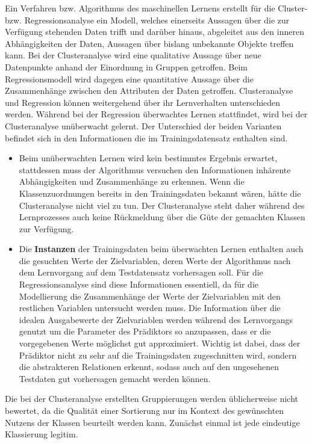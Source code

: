 \documentclass[
	12pt,
	a4paper,
	BCOR10mm,
	DIV14,
	listof=totoc,
	bibliography=totoc,
	headsepline
]{scrreprt}
\begin{document}
Ein Verfahren bzw. Algorithmus des maschinellen Lernens erstellt für die Cluster- bzw. Regressionsanalyse ein Modell, welches einerseits Aussagen über die zur Verfügung stehenden Daten trifft und darüber hinaus, abgeleitet aus den inneren Abhängigkeiten der Daten, Aussagen über bislang unbekannte Objekte treffen kann.
Bei der Clusteranalyse wird eine qualitative Aussage über neue Datenpunkte anhand der Einordnung in Gruppen getroffen.
Beim Regressionsmodell wird dagegen eine quantitative Aussage über die Zusammenhänge zwischen den Attributen der Daten getroffen. 
Clusteranalyse und Regression können weitergehend über ihr Lernverhalten unterschieden werden.
Während bei der Regression überwachtes Lernen stattfindet, wird bei der Clusteranalyse unüberwacht gelernt. Der Unterschied der beiden Varianten befindet sich in den Informationen die im Trainingsdatensatz enthalten sind.
\begin{itemize}
\item Beim unüberwachten Lernen wird kein bestimmtes Ergebnis erwartet, stattdessen muss der Algorithmus versuchen den Informationen inhärente Abhängigkeiten und Zusammenhänge zu erkennen.
Wenn die Klassenzuordnungen bereits in den Trainingsdaten bekannt wären, hätte die Clusteranalyse nicht viel zu tun. 
Der Clusteranalyse steht daher während des Lernprozesses auch keine Rückmeldung über die Güte der gemachten Klassen zur Verfügung.
\item Die \textbf{Instanzen} der Trainingsdaten beim überwachten Lernen enthalten auch die gesuchten Werte der Zielvariablen, deren Werte der Algorithmus nach dem Lernvorgang auf dem Testdatensatz vorhersagen soll.
Für die Regressionsanalyse sind diese Informationen essentiell, da für die Modellierung die Zusammenhänge der Werte der Zielvariablen mit den restlichen Variablen untersucht werden muss.
Die Information über die idealen Ausgabewerte der Zielvariablen werden während des Lernvorgangs genutzt um die Parameter des Prädiktors so anzupassen, dass er die vorgegebenen Werte möglichst gut approximiert. Wichtig ist dabei, dass der Prädiktor nicht zu sehr auf die Trainingsdaten zugeschnitten wird, sondern die abstrakteren Relationen erkennt, sodass auch auf den ungesehenen Testdaten gut vorhersagen gemacht werden können.
\end{itemize}

Die bei der Clusteranalyse erstellten Gruppierungen werden üblicherweise nicht bewertet, da die Qualität einer Sortierung nur im Kontext des gewünschten Nutzens der Klassen beurteilt werden kann.
Zunächst einmal ist jede eindeutige Klassierung legitim.
\end{document}
